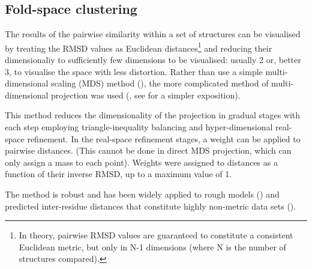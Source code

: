 \subsection{Fold-space clustering}

The results of the pairwise similarity within a set of structures can be visualised by treating the
RMSD values as Euclidean distances\footnote{In theory, pairwise RMSD values are guaranteed to constitute 
a consistent Euclidean metric, but only in N-1 dimensions (where N is the number of structures compared).
} and reducing their dimensionaliy to sufficiently few dimensions to be visualised: usually 2 or, better 3,
to visualise the space with less distortion.
Rather than use a simple multi-dimensional scaling (MDS) method (\cite{BrownNPet96}), the more complicated 
method of multi-dimensional projection was used (\cite{AszodiAet97a}, see \cite{TaylorWRet01b} for a
simpler exposition).  

This method reduces the dimensionality of the projection in gradual stages
with each step employing triangle-inequality balancing and hyper-dimensional real-space refinement.
In the real-space refinement stages, a weight can be applied to pairwise distances. (This cannot be
done in direct MDS projection, which can only assign a mass to each point).  
Weights were assigned to distances as a function of their inverse RMSD, up to a maximum value of 1.

The method is robust and
has been widely applied to rough models (\cite{TaylorWRet09a}) and predicted inter-residue distances that 
constitute highly non-metric data sets (\cite{AszodiAet94a}).


